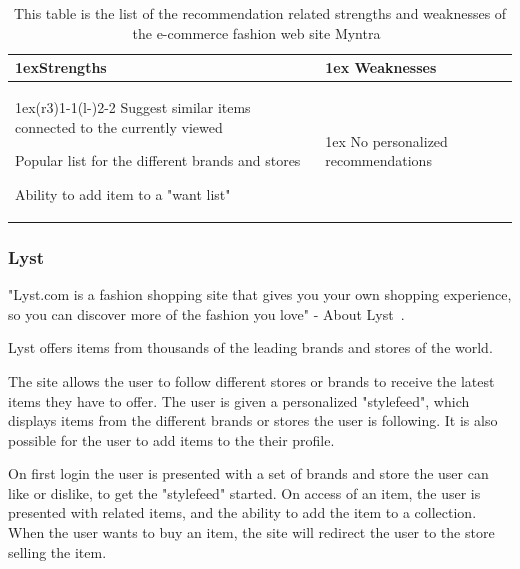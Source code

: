     \begin{table}[H]
        \centering
        \begin{tabularx}{\linewidth}{>{\parskip1ex}X@{\kern4\tabcolsep}>{\parskip1ex}X}
            \toprule
            \hfil\bfseries Strengths
            &
            \hfil\bfseries Weaknesses
            \\\cmidrule(r{3\tabcolsep}){1-1}\cmidrule(l{-\tabcolsep}){2-2}
	        Suggest similar items connected to the currently viewed \par
            Popular list for the different brands and stores \par
            Ability to add item to a "want list"\par
            &
            No personalized recommendations \par
            \\\bottomrule
        \end{tabularx}
        \caption[Recommendation related strengths and weaknesses of Myntra~\cite{myntra}]{This table is the list of the recommendation related strengths and weaknesses of the e-commerce fashion web site Myntra~\cite{myntra}}
        \label{table:ecommerceMyntra}
    \end{table}

\subsubsection{Lyst} %
\label{par:lyst}
    "Lyst.com is a fashion shopping site that gives you your own shopping experience, so you can discover more of the fashion you love" - About Lyst~\cite{lyst}.

    Lyst offers items from thousands of the leading brands and stores of the world.

    The site allows the user to follow different stores or brands to receive the latest items they have to offer.
    The user is given a personalized "stylefeed", which displays items from the different brands or stores the user is following.
    It is also possible for the user to add items to the their profile.

    On first login the user is presented with a set of brands and store the user can like or dislike, to get the "stylefeed" started.
    On access of an item, the user is presented with related items, and the ability to add the item to a collection.
    When the user wants to buy an item, the site will redirect the user to the store selling the item.

